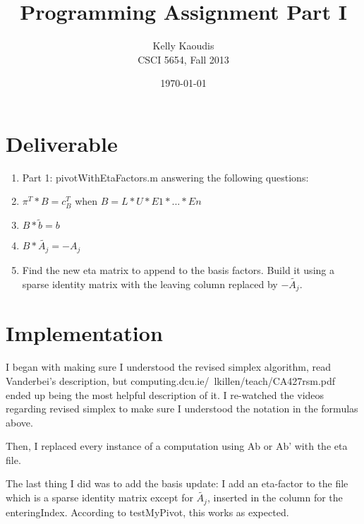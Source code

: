\documentclass[9pt]{article}
\title{Programming Assignment Part I}
\author{
        Kelly Kaoudis \\
        CSCI 5654, Fall 2013 \\
}
\date{\today}
\begin{document}
\maketitle

\section{Deliverable}
\begin{enumerate}
    \item Part 1: pivotWithEtaFactors.m answering the following questions:
    \item $ \pi^T * B = c_B^T  $ when $ B = L * U * E1 * ... * En $
    \item $ B * \tilde{b} = b $
    \item $ B * \tilde{A_j} = -A_j $
    \item Find the new eta matrix to append to the basis factors.
        Build it using a sparse identity matrix with the leaving column replaced by $ -\tilde{A_j} $.
\end{enumerate}

\section{Implementation}
I began with making sure I understood the revised
simplex algorithm, read Vanderbei's description,
but computing.dcu.ie/~lkillen/teach/CA427rsm.pdf
ended up being the most helpful description of it.
I re-watched the videos regarding revised
simplex to make sure I understood the
notation in the formulas above.

Then, I replaced every instance of a computation using Ab or Ab' with the eta file.

The last thing I did was to add the basis update: I add an eta-factor to the file which is a sparse identity
matrix except for $ \tilde{A_j} $, inserted in the column for the enteringIndex. According to testMyPivot, this
works as expected.
\end{document}
